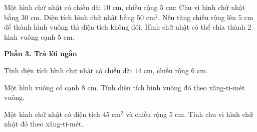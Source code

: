 \begin{ex} %
Một hình chữ nhật có chiều dài $10\text{ cm}$, chiều rộng $5\text{ cm}$:
\choiceTF
{\True Chu vi hình chữ nhật bằng $30\text{ cm}$.}
{\True Diện tích hình chữ nhật bằng $50\text{ cm}^2$.}
{Nếu tăng chiều rộng lên $5\text{ cm}$ để thành hình vuông thì diện tích không đổi.}
{\True Hình chữ nhật có thể chia thành 2 hình vuông cạnh $5\text{ cm}$.}
\end{ex}

\textbf{Phần 3. Trả lời ngắn}

\begin{ex} %
Tính diện tích hình chữ nhật có chiều dài $14\text{ cm}$, chiều rộng $6\text{ cm}$.
\end{ex}

\begin{ex} %
Một hình vuông có cạnh $8\text{ cm}$. Tính diện tích hình vuông đó theo xăng-ti-mét vuông.
\end{ex}

\begin{ex} %
Một hình chữ nhật có diện tích $45\text{ cm}^2$ và chiều rộng $5\text{ cm}$. Tính chu vi hình chữ nhật đó theo xăng-ti-mét.
\end{ex}

